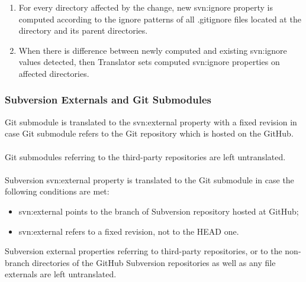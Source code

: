 \begin{enumerate}
\compactlist
\item For every directory affected by the change, new svn:ignore property is computed according to the ignore patterns of all .gitignore files located at the directory and its parent directories.\\
\item When there is difference between newly computed and existing svn:ignore values detected, then Translator sets computed svn:ignore properties on affected directories.\\
\end{enumerate}
\subsubsection{Subversion Externals and Git Submodules}
\label{section_externals_and_submodules}
Git submodule is translated to the svn:external property with a fixed revision in case Git submodule refers to the Git repository
which is hosted on the GitHub.
\\\\
Git submodules referring to the third-party repositories are left untranslated.
\\\\
Subversion svn:external property is translated to the Git submodule in case the following conditions are met:
\begin{itemize}
\item svn:external points to the branch of Subversion repository hosted at GitHub;
\item svn:external refers to a fixed revision, not to the HEAD one.
\end{itemize}
Subversion external properties referring to third-party repositories, or to the non-branch directories of the GitHub Subversion repositories as
well as any file externals are left untranslated.